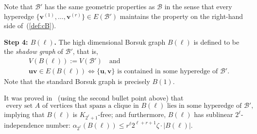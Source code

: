 \documentclass[10pt,a4paper]{article}
\newcommand{\V}[1]{\mathbold{#1}}
\theoremstyle{definition}
\newtheorem{remark}[theorem]{Remark}
\def\al{{\alpha}}
\newcommand{\cH}{\mathcal{H}}
\newcommand{\cB}{\mathcal{B}}
\begin{document}
Note that $\cB'$ has the same geometric properties as $\cB$ in the sense that every hyperedge $\{\V{v}^{(1)},\ldots,\V{v}^{(r)}\} \in E(\cB')$ maintains the property on the right-hand side of~(\ref{def:cB}).


\medskip
\noindent
\textbf{Step 4: $B(\ell)$.}	
The high dimensional Borsuk graph $B(\ell)$ is defined to be the \emph{shadow graph} of $\cB'$,  that is, 
\begin{align*}
&V(B(\ell)):=V(\cB') \quad\text{and}\\
&\V{u}\V{v} \in E(B(\ell)) \iff \{\V{u},\V{v}\}\text{ is contained in some hyperedge of }\cB'.
\end{align*}
Note that the standard Borsuk graph is precisely $B(1)$.

It was proved in~\cite[Lemmas~6, 14]{BL-2} (using the second bullet point above) that
\begin{equation}\label{eq:shadow}
	\text{ every set $A$ of vertices that spans a clique in $B(\ell)$ lies in some hyperedge of $\cB'$,}
\end{equation}
implying that $B(\ell)$ is $K_{2^{\ell}+1}$-free; and furthermore, $B(\ell)$ has sublinear $2^\ell$-independence number: $\alpha_{2^\ell}(B(\ell)) \leq  r^\ell2^{\ell+r+1}\zeta\cdot  |B(\ell)|$.

%		
%	
\end{document}
